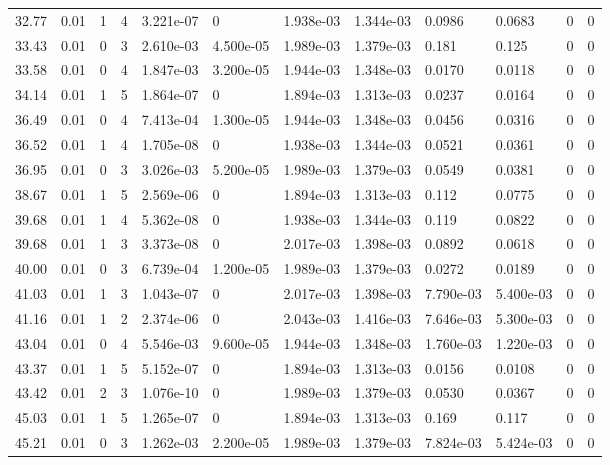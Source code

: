 \documentclass[preview]{standalone}
\begin{document}
{{{\begin{tabular}{L{1.2cm}C{1.2cm} C{0.3cm}C{0.5cm} C{1.4cm}C{1.4cm} C{1.4cm}C{1.4cm} C{1.6cm}C{1.6cm} C{1.6cm}C{1.6cm}}
  32.77  &  0.01  & 1     &  4 &  3.221e-07  & 0  &  1.938e-03&   1.344e-03& 0.0986 & 0.0683   &  0 & 0  \\ 
  33.43  &  0.01  & 0     &  3 &  2.610e-03  & 4.500e-05  &  1.989e-03&   1.379e-03& 0.181 & 0.125   &  0 & 0  \\ 
  33.58  &  0.01  & 0     &  4 &  1.847e-03  & 3.200e-05  &  1.944e-03&   1.348e-03& 0.0170 & 0.0118   &  0 & 0  \\ 
  34.14  &  0.01  & 1     &  5 &  1.864e-07  & 0  &  1.894e-03&   1.313e-03& 0.0237 & 0.0164   &  0 & 0  \\ 
  36.49  &  0.01  & 0     &  4 &  7.413e-04  & 1.300e-05  &  1.944e-03&   1.348e-03& 0.0456 & 0.0316   &  0 & 0  \\ 
  36.52  &  0.01  & 1     &  4 &  1.705e-08  & 0  &  1.938e-03&   1.344e-03& 0.0521 & 0.0361   &  0 & 0  \\ 
  36.95  &  0.01  & 0     &  3 &  3.026e-03  & 5.200e-05  &  1.989e-03&   1.379e-03& 0.0549 & 0.0381   &  0 & 0  \\ 
  38.67  &  0.01  & 1     &  5 &  2.569e-06  & 0  &  1.894e-03&   1.313e-03& 0.112 & 0.0775   &  0 & 0  \\ 
  39.68  &  0.01  & 1     &  4 &  5.362e-08  & 0  &  1.938e-03&   1.344e-03& 0.119 & 0.0822   &  0 & 0  \\ 
  39.68  &  0.01  & 1     &  3 &  3.373e-08  & 0  &  2.017e-03&   1.398e-03& 0.0892 & 0.0618   &  0 & 0  \\ 
  40.00  &  0.01  & 0     &  3 &  6.739e-04  & 1.200e-05  &  1.989e-03&   1.379e-03& 0.0272 & 0.0189   &  0 & 0  \\ 
  41.03  &  0.01  & 1     &  3 &  1.043e-07  & 0  &  2.017e-03&   1.398e-03& 7.790e-03 & 5.400e-03   &  0 & 0  \\ 
  41.16  &  0.01  & 1     &  2 &  2.374e-06  & 0  &  2.043e-03&   1.416e-03& 7.646e-03 & 5.300e-03   &  0 & 0  \\ 
  43.04  &  0.01  & 0     &  4 &  5.546e-03  & 9.600e-05  &  1.944e-03&   1.348e-03& 1.760e-03 & 1.220e-03   &  0 & 0  \\ 
  43.37  &  0.01  & 1     &  5 &  5.152e-07  & 0  &  1.894e-03&   1.313e-03& 0.0156 & 0.0108   &  0 & 0  \\ 
  43.42  &  0.01  & 2     &  3 &  1.076e-10  & 0  &  1.989e-03&   1.379e-03& 0.0530 & 0.0367   &  0 & 0  \\ 
  45.03  &  0.01  & 1     &  5 &  1.265e-07  & 0  &  1.894e-03&   1.313e-03& 0.169 & 0.117   &  0 & 0  \\ 
  45.21  &  0.01  & 0     &  3 &  1.262e-03  & 2.200e-05  &  1.989e-03&   1.379e-03& 7.824e-03 & 5.424e-03   &  0 & 0  \\ 

\end{tabular}}}}
\end{document}
